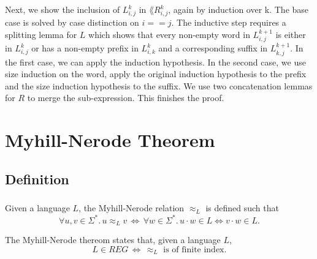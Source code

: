 \documentclass[11pt,a4paper,oneside]{book}
\begin{document}
                        \paragraph{}
                            Next, we show the inclusion of $L^k_{i,j}$ in $\lang{R^k_{i,j}}$, again by induction over k. 
                            The base case is solved by case distinction on $i==j$. 
                            The inductive step requires a splitting lemma for $L$ which shows that every non-empty word in $L^{k+1}_{i,j}$ is either in $L^k_{i,j}$ or has a non-empty prefix in $L^k_{i,k}$ and a corresponding suffix in $L^{k+1}_{k,j}$. 
                            In the first case, we can apply the induction hypothesis. 
                            In the second case, we use size induction on the word, apply the original induction hypothesis to the prefix and the size induction hypothesis to the suffix. 
                            We use two concatenation lemmas for $R$ to merge the sub-expression. 
                            This finishes the proof.
                            

            \paragraph{} 


            

        \chapter{Myhill-Nerode Theorem}

            \section{Definition}

                \paragraph{} Given a language $L$, the Myhill-Nerode relation $\approx_L$ is defined such that 
                \[
                    \forall u, v \in \Sigma^*. \,
                    u \approx_L v \, \Longleftrightarrow \, 
                    \forall w \in \Sigma^*.\, u \cdot w \in L \Leftrightarrow v \cdot w \in L.
                \]


                The Myhill-Nerode thereom states that, given a language $L$,
                \[
                    L \in REG \, \Longleftrightarrow \, \approx_L \mbox{ is of finite index.}
                \]
\end{document}
